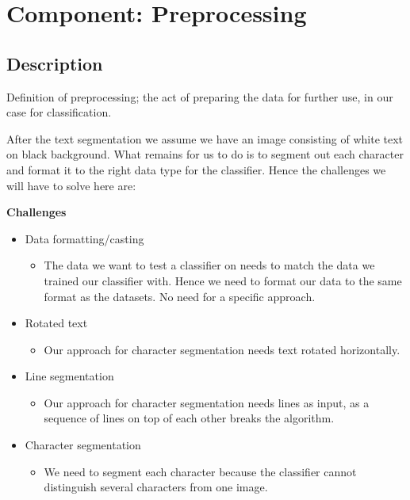 \documentclass[Report.tex]{subfiles}
\begin{document}
\section{Component: Preprocessing}
\label{Method:Preprocessing}
\subsection{Description}
Definition of preprocessing; the act of preparing the data for further use,
in our case for classification. \par
After the text segmentation we assume we have an image consisting of white text on black background. What remains for us to do is to segment out each character and format it to the right data type for the classifier. Hence the challenges we will have to solve here are:


\begin{flushleft}
  \textbf{Challenges}
  \begin{itemize}
    \item{Data formatting/casting}
    \begin{itemize}
      \item{The data we want to test a classifier on needs to match the data we trained our classifier with. Hence we need to format our data to the same format as the datasets. No need for a specific approach.}
    \end{itemize}
    \item{Rotated text}
    \begin{itemize}
      \item{Our approach for character segmentation needs text rotated horizontally.}
    \end{itemize}
      \item{Line segmentation}
    \begin{itemize}
      \item{Our approach for character segmentation needs lines as input, as a sequence of lines on top of each other breaks the algorithm.}
    \end{itemize}
      \item{Character segmentation}
    \begin{itemize}
      \item{We need to segment each character because the classifier cannot distinguish several characters from one image.}
    \end{itemize}
  \end{itemize}
\end{flushleft}
\end{document}
